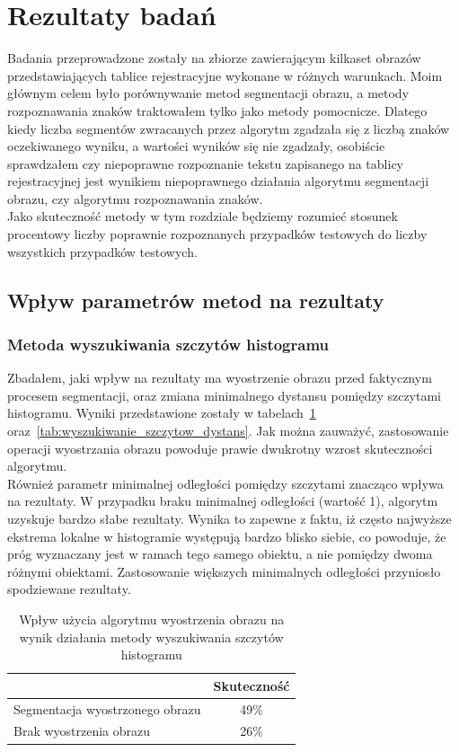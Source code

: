 \section{Rezultaty badań}
Badania przeprowadzone zostały na zbiorze zawierającym kilkaset obrazów przedstawiających tablice rejestracyjne wykonane w różnych warunkach. Moim głównym celem było porównywanie metod segmentacji obrazu, a metody rozpoznawania znaków traktowałem tylko jako metody pomocnicze. Dlatego kiedy liczba segmentów zwracanych przez algorytm zgadzała się z liczbą znaków oczekiwanego wyniku, a wartości wyników się nie zgadzały, osobiście sprawdzałem czy niepoprawne rozpoznanie tekstu zapisanego na tablicy rejestracyjnej jest wynikiem niepoprawnego działania algorytmu segmentacji obrazu, czy algorytmu rozpoznawania znaków. \\
Jako skuteczność metody w tym rozdziale będziemy rozumieć stosunek procentowy liczby poprawnie rozpoznanych przypadków testowych do liczby wszystkich przypadków testowych.

\subsection{Wpływ parametrów metod na rezultaty}
\subsubsection{Metoda wyszukiwania szczytów histogramu}
Zbadałem, jaki wpływ na rezultaty ma wyostrzenie obrazu przed faktycznym procesem segmentacji, oraz zmiana minimalnego dystansu pomiędzy szczytami histogramu. Wyniki przedstawione zostały w tabelach~\ref{tab:wyszukiwanie_szczytow_wyostrz} oraz~\ref{tab:wyszukiwanie_szczytow_dystans}. Jak można zauważyć, zastosowanie operacji wyostrzania obrazu powoduje prawie dwukrotny wzrost skuteczności algorytmu. \\
Również parametr minimalnej odległości pomiędzy szczytami znacząco wpływa na rezultaty. W przypadku braku minimalnej odległości (wartość 1), algorytm uzyskuje bardzo słabe rezultaty. Wynika to zapewne z faktu, iż często najwyższe ekstrema lokalne w histogramie występują bardzo blisko siebie, co powoduje, że próg wyznaczany jest w ramach tego samego obiektu, a nie pomiędzy dwoma różnymi obiektami. Zastosowanie większych minimalnych odległości przyniosło spodziewane rezultaty.

\begin {table}[H]
  \begin{center}
    \begin{tabular}{l | c}
      \space & Skuteczność \\
      \hline
      Segmentacja wyostrzonego obrazu & 49\% \\
      Brak wyostrzenia obrazu & 26\%
    \end{tabular}
    \caption {Wpływ użycia algorytmu wyostrzenia obrazu na wynik działania metody wyszukiwania szczytów histogramu}
    \label{tab:wyszukiwanie_szczytow_wyostrz} 
  \end{center}
\end {table}

